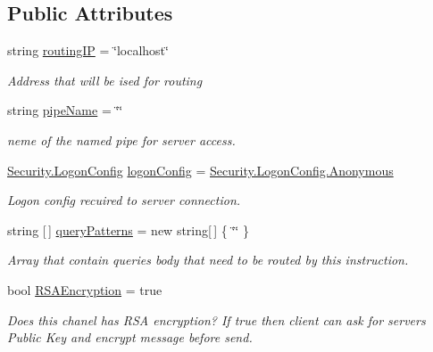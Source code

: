 \subsection*{Public Attributes}
\begin{DoxyCompactItemize}
\item 
string \mbox{\hyperlink{class_pipes_provider_1_1_networking_1_1_routing_1_1_instruction_adb75f80ff34fab644305856ccf23d07b}{routing\+IP}} = \char`\"{}localhost\char`\"{}
\begin{DoxyCompactList}\small\item\em Address that will be ised for routing \end{DoxyCompactList}\item 
string \mbox{\hyperlink{class_pipes_provider_1_1_networking_1_1_routing_1_1_instruction_abe54e245df8dd26547b0c881b987202b}{pipe\+Name}} = \char`\"{}\char`\"{}
\begin{DoxyCompactList}\small\item\em neme of the named pipe for server access. \end{DoxyCompactList}\item 
\mbox{\hyperlink{struct_pipes_provider_1_1_security_1_1_logon_config}{Security.\+Logon\+Config}} \mbox{\hyperlink{class_pipes_provider_1_1_networking_1_1_routing_1_1_instruction_a2a3325abd7537b7a961626272634e038}{logon\+Config}} = \mbox{\hyperlink{struct_pipes_provider_1_1_security_1_1_logon_config_ad09f6e3c892826dc5df995e02f7a5738}{Security.\+Logon\+Config.\+Anonymous}}
\begin{DoxyCompactList}\small\item\em Logon config recuired to server connection. \end{DoxyCompactList}\item 
string \mbox{[}$\,$\mbox{]} \mbox{\hyperlink{class_pipes_provider_1_1_networking_1_1_routing_1_1_instruction_aa98823848a42831095f92b639121cc67}{query\+Patterns}} = new string\mbox{[}$\,$\mbox{]} \{ \char`\"{}\char`\"{} \}
\begin{DoxyCompactList}\small\item\em Array that contain querie\textquotesingle{}s body that need to be routed by this instruction. \end{DoxyCompactList}\item 
bool \mbox{\hyperlink{class_pipes_provider_1_1_networking_1_1_routing_1_1_instruction_a61ce6ffa8bb9cc44efc57bc51be3550b}{R\+S\+A\+Encryption}} = true
\begin{DoxyCompactList}\small\item\em Does this chanel has R\+SA encryption? If true then client can ask for server\textquotesingle{}s Public Key and encrypt message before send. \end{DoxyCompactList}\end{DoxyCompactItemize}
